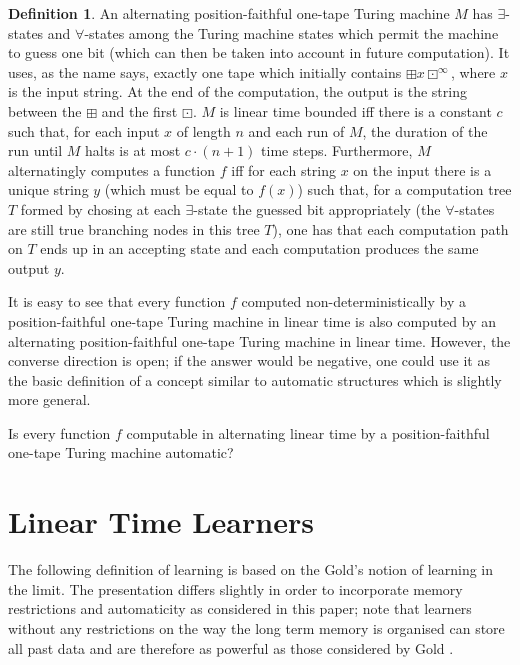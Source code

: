 \documentclass{LMCS}
\theoremstyle{plain}\newtheorem{athm}[thm]{Theorem}
\theoremstyle{plain}\newtheorem{aprop}[thm]{Proposition}
\theoremstyle{plain}\newtheorem{aprob}[thm]{Open Problem}
\theoremstyle{plain}\newtheorem{acor}[thm]{Corollary}
\theoremstyle{plain}\newtheorem{alem}[thm]{Lemma}
\theoremstyle{definition}\newtheorem{adefn}[thm]{Definition}
\theoremstyle{definition}\newtheorem{arem}[thm]{Remark}
\theoremstyle{plain}\newtheorem{aexmp}[thm]{Example}
\theoremstyle{plain}\newtheorem{aclm}[thm]{Claim}
\begin{document}
\begin{adefn} \rm
An alternating position-faithful one-tape Turing machine $M$ has
$\exists$-states and $\forall$-states among the Turing machine 
states which permit the machine to guess one bit (which can then
be taken into account in future computation).
It uses, as the name says, exactly one tape which initially
contains $\boxplus x \boxdot^{\infty}$, where $x$ is the input string.
At the end of the computation, the output is the string 
between the $\boxplus$ and the first $\boxdot$.
$M$ is linear time bounded iff there is a constant $c$ such that, for
each input $x$ of length $n$ and each run of $M$, the duration of
the run until $M$ halts is at most $c\cdot (n+1)$ time steps.
Furthermore, $M$ alternatingly computes a function $f$
iff for each string $x$ on the input there is a unique string $y$ 
(which must be equal to $f(x)$) such that,
for a computation tree $T$ formed by chosing at each $\exists$-state
the guessed bit appropriately (the $\forall$-states are still
true branching nodes in this tree $T$), one has that
each computation path on $T$ ends up in an accepting state 
and each computation produces the same output $y$.
\end{adefn}

\noindent
It is easy to see that every function $f$ computed non-deterministically
by a position-faithful one-tape Turing machine in linear time
is also computed by an alternating position-faithful one-tape Turing
machine in linear time. However, the converse direction is open;
if the answer would be negative, one could use it as the basic definition
of a concept similar to automatic structures which is slightly more
general.

\begin{oprob}
Is every function $f$ computable in alternating linear time
by a position-faithful one-tape Turing machine automatic?
\end{oprob}


\section{Linear Time Learners} \label{se:lintimelearn}

\noindent
The following definition of learning is based on
the Gold's \cite{Go67} notion of learning in the limit. The presentation
differs slightly in order to incorporate memory restrictions and automaticity
as considered in this paper; note that learners without any restrictions
on the way the long term memory is organised can store all past data and
are therefore as powerful as those considered by Gold \cite{Go67}.
\end{document}
